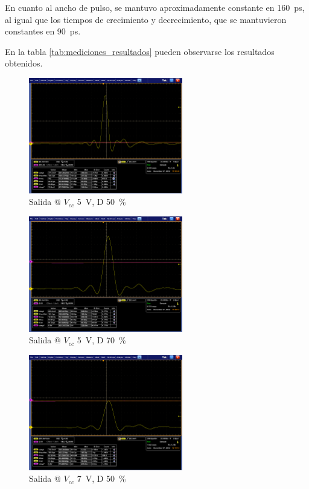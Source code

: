 En cuanto al ancho de pulso, se mantuvo aproximadamente constante en
\qty{160}{\pico\second}, al igual que los tiempos de crecimiento y
decrecimiento, que se mantuvieron constantes en \qty{90}{\pico\second}.

En la tabla \ref{tab:mediciones_resultados} pueden observarse los resultados obtenidos.

\begin{figure}
  \centering
    \includegraphics[width=0.6\textwidth]{images/mediciones/vcc_5v_duty_50.png}
    \caption{Salida @ $V_{cc}$ \qty{5}{\volt}, D \qty{50}{\percent} }
    \label{fig:mediciones_5v_50}
\end{figure}

\begin{figure}
  \centering
    \includegraphics[width=0.6\textwidth]{images/mediciones/vcc_5v_duty_70.png}
    \caption{Salida @ $V_{cc}$ \qty{5}{\volt}, D \qty{70}{\percent} }
    \label{fig:mediciones_5v_70}
\end{figure}

\begin{figure}
  \centering
    \includegraphics[width=0.6\textwidth]{images/mediciones/vcc_7v_duty_50.png}
    \caption{Salida @ $V_{cc}$ \qty{7}{\volt}, D \qty{50}{\percent} }
    \label{fig:mediciones_7v_50}
\end{figure}

